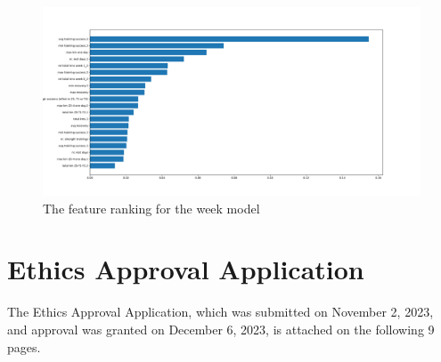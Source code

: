 \begin{figure}
  \centering
  \includegraphics[width=\linewidth]{figures/week_featureranking.pdf}
  \captionsetup{justification=centering}
  \caption[Week Feature Ranking Chart]{\label{fig:app_week_features}The feature ranking for the week model}
\end{figure}

\newpage
\section{\label{sec:ethics-approval-application}Ethics Approval Application}
The Ethics Approval Application, which was submitted on November 2, 2023, and approval was granted on December 6, 2023, is attached on the following 9 pages.
